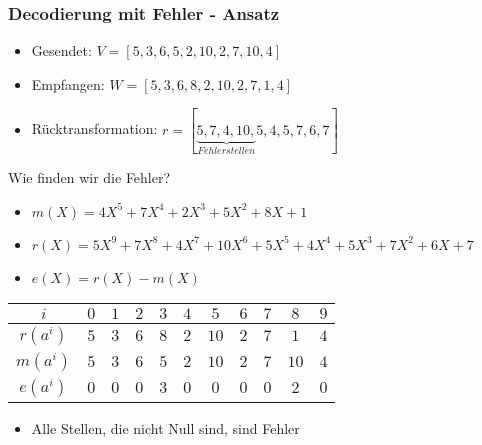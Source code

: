 \documentclass[11pt,aspectratio=169]{beamer}
\begin{document}
	\begin{frame}
		\frametitle{Decodierung mit Fehler - Ansatz}	
		
		\begin{itemize}
			\item Gesendet: $V = [5,3,6,5,2,10,2,7,10,4]$
			
			\item Empfangen: $W = [5,3,6,8,2,10,2,7,1,4]$
			
			\item Rücktransformation: $r = [\underbrace{5,7,4,10,}_{Fehlerstellen}5,4,5,7,6,7]$
		\end{itemize}
		
		Wie finden wir die Fehler?
		
		\begin{itemize}
			\item $m(X) = 4X^5 + 7X^4 + 2X^3 + 5X^2 + 8X + 1$
			
			\item $r(X) = 5X^9 + 7X^8 + 4X^7 + 10X^6 + 5X^5 + 4X^4 + 5X^3 + 7X^2 + 6X + 7$
			
			\item $e(X) = r(X) - m(X)$
		\end{itemize}	
		
		\begin{center}
			
		\begin{tabular}{c c c c c c c c c c c}
			\hline
			$i$& $0$& $1$& $2$& $3$& $4$& $5$& $6$& $7$& $8$& $9$\\
			\hline
			$r(a^{i})$& $5$& $3$& $6$& $8$& $2$& $10$& $2$& $7$& $1$& $4$\\
			$m(a^{i})$& $5$& $3$& $6$& $5$& $2$& $10$& $2$& $7$& $10$& $4$\\
			$e(a^{i})$& $0$& $0$& $0$& $3$& $0$& $0$& $0$& $0$& $2$& $0$\\
			\hline
		\end{tabular}	
			
		\end{center}
		
		\begin{itemize}
			\item Alle Stellen, die nicht Null sind, sind Fehler
		\end{itemize}
		
	\end{frame}
\end{document}

